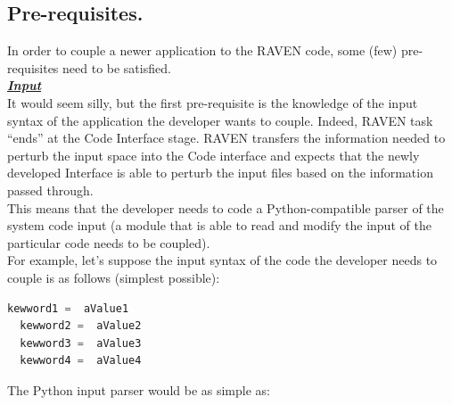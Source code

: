 \subsection{Pre-requisites.} 
\label{subsec:prerequisites}
In order to couple a newer application to the RAVEN code, some (few) pre-requisites need to be satisfied.
\newline
\\\textbf{\textit{\underline{Input}}}
\newline
\\ It would seem silly, but the first pre-requisite is the knowledge of the input 
syntax of the application the developer wants to couple. Indeed, RAVEN task
 ``ends'' at the Code Interface stage. RAVEN transfers the information needed 
 to perturb the input space into the Code interface and expects that the newly 
 developed Interface is able to perturb the input files based on the information 
 passed through.
\\This means that the developer needs to code a Python-compatible parser of
 the system code input (a module that is able to read and modify the input of 
 the particular code needs to be coupled).
\\ For example, let's suppose the input syntax of the code the developer needs 
to couple is as follows (simplest possible):
\begin{lstlisting}[language=python]
  kewword1 =  aValue1
  kewword2 =  aValue2
  kewword3 =  aValue3
  kewword4 =  aValue4
\end{lstlisting} 
The Python input parser would be as simple as:

